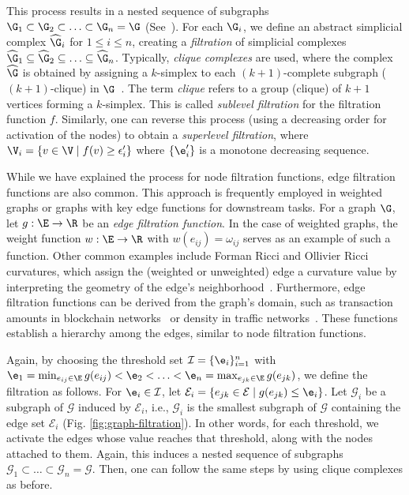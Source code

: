 This process results in a nested sequence of subgraphs $\G_1 \subset \G_2 \subset \ldots \subset \G_n = \G$ (See~). For each $\G_i$, we define an abstract simplicial complex $\widehat{\G}_i$ for $1 \leq i \leq n$, creating a \textit{filtration} of simplicial complexes $\widehat{\G}_1 \subseteq \widehat{\G}_2 \subseteq \ldots \subseteq \widehat{\G}_n$. Typically, \textit{clique complexes} are used, where the complex $\widehat{\G}$ is obtained by assigning a $k$-simplex to each $(k+1)$-complete subgraph ($(k+1)$-clique) in $\G$~\cite{aktas2019persistence}. The term \textit{clique} refers to a group (clique) of $k+1$ vertices forming a $k$-simplex.  This is called {\em sublevel filtration} for the filtration function $f$. Similarly, one can reverse this process (using a decreasing order for activation of the nodes) to obtain a \textit{superlevel filtration}, where $\V_i = \{v \in \V \mid f(v) \geq \epsilon_i'\}$ where $\{\e_i'\}$ is a monotone decreasing sequence. %

While we have explained the process for node filtration functions, edge filtration functions are also common. This approach is frequently employed in weighted graphs or graphs with key edge functions for downstream tasks. For a graph $\G$, let $g: \E \to \R$ be an \textit{edge filtration function}. In the case of weighted graphs, the weight function $w: \E \to \R$ with $w(e_{ij}) = \omega_{ij}$ serves as an example of such a function. Other common examples include Forman Ricci and Ollivier Ricci curvatures, which assign the (weighted or unweighted) edge a curvature value by interpreting the geometry of the edge's neighborhood~\cite{fesser2024augmentations}. Furthermore, edge filtration functions can be derived from the graph's domain, such as transaction amounts in blockchain networks~\cite{abay2019chainnet} or density in traffic networks~\cite{carmody2021topological}. These functions establish a hierarchy among the edges, similar to node filtration functions.

  

Again, by choosing the threshold set $\mathcal{I}=\{\e_i\}_{i=1}^n$ with $\e_1=\min_{e_{ij}\in\E}g(e_{ij})<\e_2<\ldots<\e_n=\max_{e_{jk}\in\E}g(e_{jk})$, we define the filtration as follows. For $\e_i\in \mathcal{I}$, let $\mathcal{E}_i=\{e_{jk}\in\mathcal{E}\mid g(e_{jk})\leq \e_i\}$. %
Let $\mathcal{G}_i$ be a subgraph of $\mathcal{G}$ induced by $\mathcal{E}_i$, i.e., $\mathcal{G}_i$ is the smallest subgraph of $\mathcal{G}$ containing the edge set $\mathcal{E}_i$ (Fig. \ref{fig:graph-filtration}). In other words, for each threshold, we activate the edges whose value reaches that threshold, along with the nodes attached to them. Again, this induces a nested sequence of subgraphs $\mathcal{G}_1\subset  \dots\subset\mathcal{G}_n=\mathcal{G}$. Then, one can follow the same steps by using clique complexes as before. 

